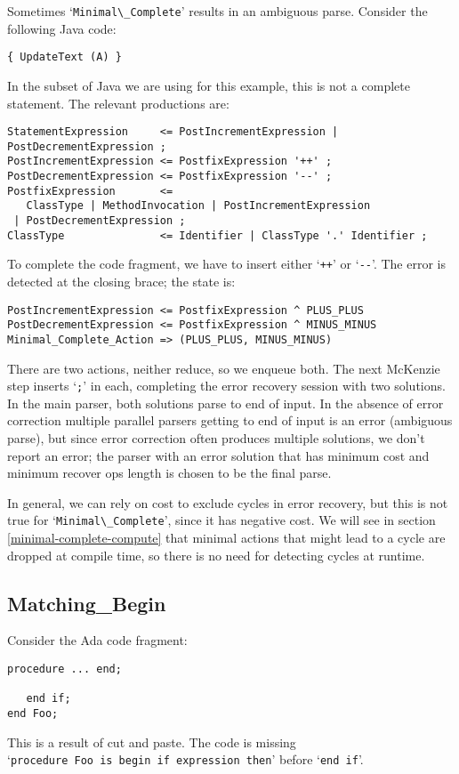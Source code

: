 \documentclass{article}
\newcommand{\code}[1]{`\lstinline|#1|'}
\begin{document}
Sometimes \code{Minimal\_Complete} results in an ambiguous
parse. Consider the following Java code:
\begin{lstlisting}
{ UpdateText (A) }
\end{lstlisting}
In the subset of Java we are using for this example, this is not a
complete statement. The relevant productions are:
\begin{verbatim}
StatementExpression     <= PostIncrementExpression | PostDecrementExpression ;
PostIncrementExpression <= PostfixExpression '++' ;
PostDecrementExpression <= PostfixExpression '--' ;
PostfixExpression       <=
   ClassType | MethodInvocation | PostIncrementExpression
 | PostDecrementExpression ;
ClassType               <= Identifier | ClassType '.' Identifier ;
\end{verbatim}
To complete the code fragment, we have to insert either
\code{++} or \code{--}. The error is detected at the closing brace;
the state is:
\begin{verbatim}
PostIncrementExpression <= PostfixExpression ^ PLUS_PLUS
PostDecrementExpression <= PostfixExpression ^ MINUS_MINUS
Minimal_Complete_Action => (PLUS_PLUS, MINUS_MINUS)
\end{verbatim}
There are two actions, neither reduce, so we enqueue both. The next
McKenzie step inserts \code{;} in each, completing the error recovery
session with two solutions. In the main parser, both solutions parse
to end of input. In the absence of error correction multiple parallel
parsers getting to end of input is an error (ambiguous parse), but
since error correction often produces multiple solutions, we don't
report an error; the parser with an error solution that has minimum
cost and minimum recover ops length is chosen to be the final parse.

In general, we can rely on cost to exclude cycles in error recovery,
but this is not true for \code{Minimal\_Complete}, since it has
negative cost. We will see in section \ref{minimal-complete-compute}
that minimal actions that might lead to a cycle are dropped at
compile time, so there is no need for detecting cycles at runtime.

\subsection{Matching\_Begin}
Consider the Ada code fragment:
\begin{lstlisting}
procedure ... end;

   end if;
end Foo;
\end{lstlisting}
This is a result of cut and paste. The code is missing
\\ \code{procedure Foo is begin if expression then} before
\code{end if}.
\end{document}
